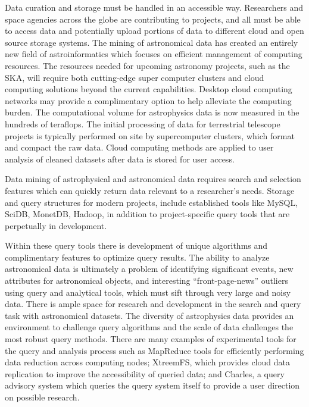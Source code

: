 \documentclass[sigconf]{acmart}
\begin{document}
Data curation and storage must be handled in an accessible way. Researchers and space agencies across the globe are contributing to projects, and all must be able to access data and potentially upload portions of data to different cloud and open source storage systems\cite{Gannon2014,Stephens2008}. The mining of astronomical data has created an entirely new field of astroinformatics \cite{Borne2009} which focuses on efficient management of computing resources. The resources needed for upcoming astronomy projects, such as the SKA, will require both cutting-edge super computer clusters and cloud computing solutions beyond the current capabilities. Desktop cloud computing networks may provide a complimentary option to help alleviate the computing burden\cite{Newman2011}. The computational volume for astrophysics data is now measured in the hundreds of teraflops. The initial processing of data for terrestrial telescope projects is typically performed on site by supercomputer clusters, which format and compact the raw data. Cloud computing methods are applied to user analysis of cleaned datasets after data is stored for user access\cite{Newman2011}. 

Data mining of astrophysical and astronomical data requires search and selection features which can quickly return data relevant to a researcher's needs. Storage and query structures for modern projects, include established tools like MySQL, SciDB, MonetDB, Hadoop, in addition to project-specific query tools that are perpetually in development\cite{Ivezic2014,Stephens2010}. 

Within these query tools there is development of unique algorithms and complimentary features to optimize query results. The ability to analyze astronomical data is ultimately a problem of identifying significant events, new attributes for astronomical objects, and interesting ``front-page-news\cite{Borne2008}'' outliers using query and analytical tools, which must sift through very large and noisy data. There is ample space for research and development in the search and query task with astronomical datasets. The diversity of astrophysics data provides an environment to challenge query algorithms and the scale of data challenges the most robust query methods. There are many examples of experimental tools for the query and analysis process such as MapReduce\cite{Enke2012} tools for efficiently performing data reduction across computing nodes; XtreemFS\cite{Enke2012}, which provides cloud data replication to improve the accessibility of queried data; and Charles\cite{Sellam2013}, a query advisory system which queries the query system itself to provide a user direction on possible research.
 
\end{document}

